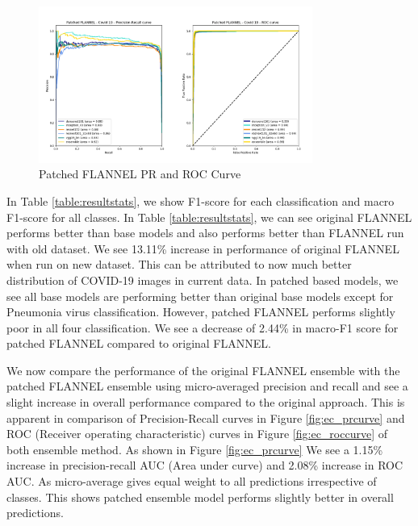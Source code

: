 \documentclass{sigkddExp}
\begin{document}
\begin{figure}[!htpb]
    \centering
    \includegraphics[width=0.8\textwidth]{../doc/images/patched_flannel_covid_19_plot_curve.png}
    \caption{Patched FLANNEL PR and ROC Curve}
    \label{fig:pf_roccurve}
\end{figure}


In Table \ref{table:resultstats}, we show F1-score for each classification
and macro F1-score for all classes. In Table \ref{table:resultstats}, we can see
original FLANNEL performs better than base models and also performs better than
FLANNEL run with old dataset\cite{10.1093/jamia/ocaa280}. We see 13.11\% increase in performance of original
FLANNEL when run on new dataset. This can be attributed to now much better distribution
of COVID-19 images in current data. In patched based models, we see all base models
are performing better than original base models except for Pneumonia virus classification.
However, patched FLANNEL performs slightly poor in all four classification.
We see a decrease of 2.44\% in macro-F1 score for patched FLANNEL compared to
original FLANNEL.


We now compare the performance of the original FLANNEL ensemble with the patched
FLANNEL ensemble using micro-averaged precision and recall and see a slight
increase in overall performance compared to the original approach. This is
apparent in comparison of Precision-Recall curves in Figure \ref{fig:ec_prcurve}
and ROC (Receiver operating characteristic) curves in Figure
\ref{fig:ec_roccurve} of both ensemble method. As shown in Figure
\ref{fig:ec_prcurve} We see a 1.15\% increase in precision-recall AUC (Area
under curve) and 2.08\% increase in ROC AUC. As micro-average gives equal weight
to all predictions irrespective of classes. This shows patched ensemble model
performs slightly better in overall predictions.
\end{document}
